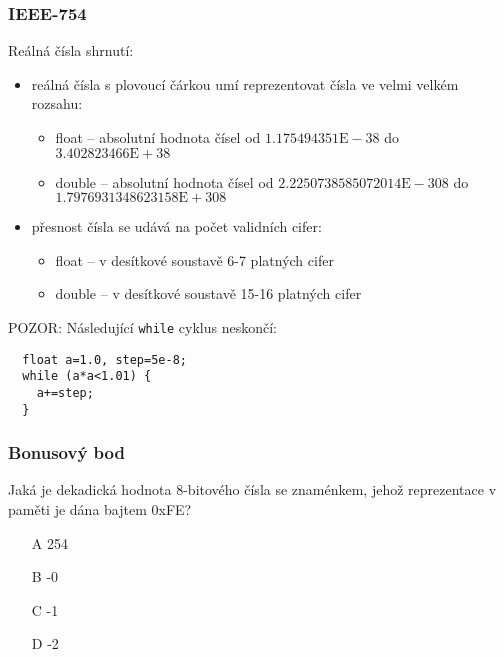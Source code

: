\documentclass{beamer}
\begin{document}
\begin{frame}[fragile]
\frametitle{IEEE-754}

Reálná čísla shrnutí:
\begin{itemize}
\item reálná čísla s plovoucí čárkou umí reprezentovat čísla ve velmi velkém rozsahu:
\begin{itemize}
\item float -- absolutní hodnota čísel od $1.175494351\text{E}-38$ do $3.402823466\text{E} + 38$
\item double -- absolutní hodnota čísel od $2.2250738585072014\text{E} - 308$ do $1.7976931348623158\text{E} + 308$
\end{itemize}
\item přesnost čísla se udává na počet validních cifer:
\begin{itemize}
\item float -- v desítkové soustavě 6-7 platných cifer
\item double -- v desítkové soustavě 15-16 platných cifer
\end{itemize}
\end{itemize}

POZOR: Následující \texttt{while} cyklus neskončí:
\begin{verbatim}
  float a=1.0, step=5e-8;
  while (a*a<1.01) {
    a+=step;
  }
\end{verbatim}
\end{frame}


\begin{frame}
\frametitle{Bonusový bod}

Jaká je dekadická hodnota 8-bitového čísla se znaménkem, jehož reprezentace v paměti je dána bajtem 0xFE?
\begin{itemize}
\item[A] 254
\item[B] -0
\item[C] -1
\item[D] -2
\end{itemize}

\end{frame}
\end{document}
